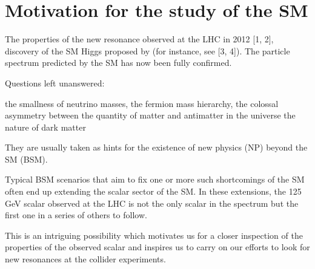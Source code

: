 \documentclass[11pt]{article}
\begin{document}
\section{Motivation for the study of the SM}

The properties of the new resonance observed at the LHC in 2012 [1, 2], discovery of the SM Higgs proposed by (for instance, see [3, 4]). 
The particle spectrum predicted by the SM has now been fully confirmed. 





Questions left unanswered: 

the smallness of neutrino masses, 
the fermion mass hierarchy, 
the colossal asymmetry between the quantity of matter and antimatter in the universe
the nature of dark matter 

They are usually taken as hints for the existence of new physics (NP) beyond the SM (BSM).

Typical BSM scenarios that aim to fix one or more such shortcomings of the SM often end up extending the scalar sector of the SM. In these extensions, the 125 GeV scalar observed at the LHC is not the only scalar in the spectrum but the first one in a series of others to follow.

This is an intriguing possibility which motivates us for a closer inspection of the properties of the observed scalar and inspires us to carry on our efforts to look for new resonances at the collider experiments.
\end{document}
